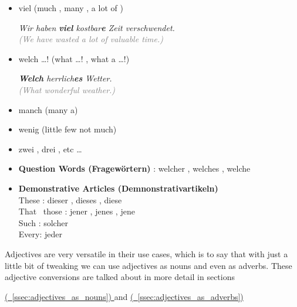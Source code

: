 \documentclass[a4paper,twocolumn,10pt]{article}
\newcommand{\newpar}
{\par \vspace{0.3cm}}
\newcommand{\refssec}[1]
{
	\hyperref[sec:#1]
	{
		(\textsection~\ref{ssec:#1})
	}
}
\begin{document}
\begin{itemize}[noitemsep]
		\newpar

	\item viel (much , many , a lot of )

		\textit{Wir haben \textbf{viel}
			kostbar\textbf{\textcolor{green-goethe}{e}} Zeit verschwendet.}\\
		\textcolor{gray} { \textit{(We have wasted a lot of valuable time.)} }
		\newpar

	\item welch \ldots ! (what \ldots ! , what a \ldots !)

		\textit{\textbf{Welch} herrlich\textbf{\textcolor{green-goethe}{es}}
			Wetter.}\\
		\textcolor{gray} { \textit{(What wonderful weather.)} }
		\newpar

	\item manch (many a)

	\item wenig (little few not much)
 
	\item zwei , drei , etc \ldots


\end{itemize}







\begin{itemize}[noitemsep]
	\item \textbf{Question Words (Fragewörtern)} : welcher , welches , welche
	\item \textbf{Demonstrative Articles (Demnonstrativartikeln)} \\
		These : dieser , dieses , diese \\
		That \ those : jener , jenes , jene \\
		Such : solcher\\
		Every: jeder
\end{itemize}


Adjectives are very versatile in their use cases, which is to say that with just
a little bit of tweaking we can use adjectives as nouns and even as adverbs.
These adjective conversions are talked about in more detail in sections
\refssec{adjectives_as_nouns} and \refssec{adjectives_as_adverbs} \newpar
\end{document}
